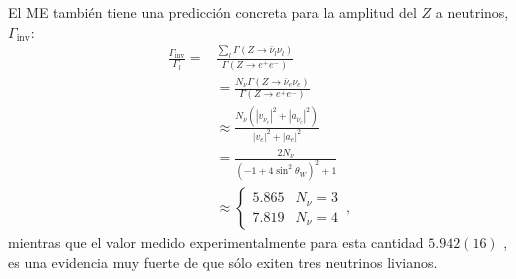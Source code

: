 \begin{frame}
El ME también tiene una predicción concreta para la amplitud del $Z$ a neutrinos, $\Gamma_{\text{inv}}$:
\begin{align}
  \frac{\Gamma_{\text{inv}}}{\Gamma_l}=&\frac{\sum_l\Gamma(Z\to\bar{\nu}_l\nu_l)}{\Gamma(Z\to e^+ e^-)}\nonumber\\
  &=\frac{N_\nu\Gamma(Z\to\bar{\nu}_e\nu_e)}{\Gamma(Z\to e^+ e^-)}\nonumber\\
  &\approx\frac{N_\nu(|v_{\nu_e}|^2+|a_{\nu_e}|^2)}{|v_{e}|^2+|a_{e}|^2}\nonumber\\
  &=\frac{2N_\nu}{(-1+4\sin^2\theta_W)^2+1}\nonumber\\
  &\approx\begin{cases}
    5.865&N_\nu=3\\
    7.819&N_\nu=4
  \end{cases}\,,
\end{align}
mientras que el valor medido experimentalmente para esta cantidad $5.942(16)$ \cite{a}, es una evidencia muy fuerte de que sólo exiten tres neutrinos livianos. 
\end{frame}
